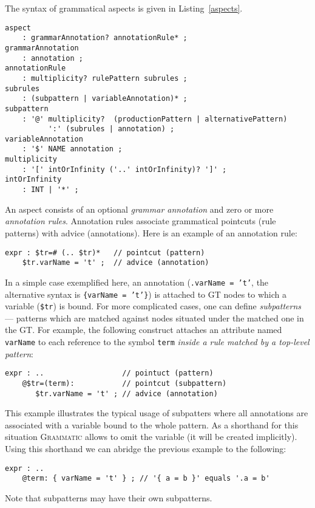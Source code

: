 \documentclass{IOS-Book-Article}     %
\newcommand{\lstref}[1]{Listing~\ref{#1}}
\newcommand{\tool}[1]{\textsc{#1}}
\newcommand{\Grammatic}[0]{\tool{Grammatic}}
\begin{document}
The syntax of grammatical aspects is given in \lstref{aspects}. 
\begin{lstlisting}[language=Grammatic,float,label=aspects,caption=Grammar of the aspect language]
aspect
	: grammarAnnotation? annotationRule* ;
grammarAnnotation
	: annotation ;
annotationRule
	: multiplicity? rulePattern subrules ; 
subrules
	: (subpattern | variableAnnotation)* ;
subpattern
	: '@' multiplicity?  (productionPattern | alternativePattern) 
	      ':' (subrules | annotation) ;
variableAnnotation
	: '$' NAME annotation ;
multiplicity
	: '[' intOrInfinity ('..' intOrInfinity)? ']' ;
intOrInfinity
	: INT | '*' ;
\end{lstlisting}
An aspect consists of an optional \emph{grammar annotation} and zero or more \emph{annotation rules}. Annotation rules associate grammatical pointcuts (rule patterns) with advice (annotations). Here is an example of an annotation rule:
\begin{lstlisting}[language=Grammatic]
expr : $tr=# (.. $tr)*   // pointcut (pattern)
    $tr.varName = 't' ;  // advice (annotation)
\end{lstlisting}
In a simple case exemplified here, an annotation (\texttt{.varName = 't'}, the alternative syntax is \texttt{\{varName = 't'\}}) is attached to GT nodes to which a variable (\texttt{\$tr}) is bound.
For more complicated cases, one can define \emph{subpatterns} --- patterns which are matched against nodes situated under the matched one in the GT. For example, the following construct attaches an attribute named \texttt{varName} to each reference to the symbol \texttt{term} \emph{inside a rule matched by a top-level pattern}:
\begin{lstlisting}[language=Grammatic]
expr : ..                  // pointuct (pattern) 
    @$tr=(term):           // pointcut (subpattern)
       $tr.varName = 't' ; // advice (annotation)
\end{lstlisting}
This example illustrates the typical usage of subpatters where all annotations are associated with a variable bound to the whole pattern. As a shorthand for this situation \Grammatic{} allows to omit the variable (it will be created implicitly). Using this shorthand we can abridge the previous example to the following:
\begin{lstlisting}[language=Grammatic]
expr : ..               
    @term: { varName = 't' } ; // '{ a = b }' equals '.a = b'
\end{lstlisting}
Note that subpatterns may have their own subpatterns.
\end{document}

